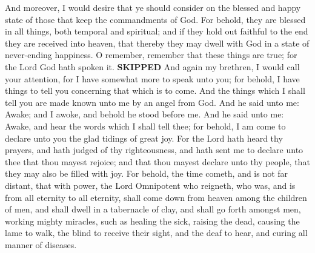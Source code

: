And moreover, I would desire that ye should consider on the blessed and happy state of those that keep the commandments of God. For behold, they are blessed in all things, both temporal and spiritual; and if they hold out faithful to the end they are received into heaven, that thereby they may dwell with God in a state of never-ending happiness. O remember, remember that these things are true; for the Lord God hath spoken it.
\bchapter \textbf{SKIPPED}
\bverse \iffalse And again my brethren, I would call your attention, for I have somewhat more to speak unto you; for behold, I have things to tell you concerning that which is to come. \fi
And again my brethren, I would call your attention, for I have somewhat more to speak unto you; for behold, I have things to tell you concerning that which is to come.
\bverse \iffalse And the things which I shall tell you are made known unto me by an angel from God. And he said unto me: Awake; and I awoke, and behold he stood before me. \fi
And the things which I shall tell you are made known unto me by an angel from God. And he said unto me: Awake; and I awoke, and behold he stood before me.
\bverse \iffalse And he said unto me: Awake, and hear the words which I shall tell thee; for behold, I am come to declare unto you the glad tidings of great joy. \fi
And he said unto me: Awake, and hear the words which I shall tell thee; for behold, I am come to declare unto you the glad tidings of great joy.
\bverse \iffalse For the Lord hath heard thy prayers, and hath judged of thy righteousness, and hath sent me to declare unto thee that thou mayest rejoice; and that thou mayest declare unto thy people, that they may also be filled with joy. \fi
For the Lord hath heard thy prayers, and hath judged of thy righteousness, and hath sent me to declare unto thee that thou mayest rejoice; and that thou mayest declare unto thy people, that they may also be filled with joy.
\bverse \iffalse For behold, the time cometh, and is not far distant, that with power, the Lord Omnipotent who reigneth, who was, and is from all eternity to all eternity, shall come down from heaven among the children of men, and shall dwell in a tabernacle of clay, and shall go forth amongst men, working mighty miracles, such as healing the sick, raising the dead, causing the lame to walk, the blind to receive their sight, and the deaf to hear, and curing all manner of diseases. \fi
For behold, the time cometh, and is not far distant, that with power, the Lord Omnipotent who reigneth, who was, and is from all eternity to all eternity, shall come down from heaven among the children of men, and shall dwell in a tabernacle of clay, and shall go forth amongst men, working mighty miracles, such as healing the sick, raising the dead, causing the lame to walk, the blind to receive their sight, and the deaf to hear, and curing all manner of diseases.
